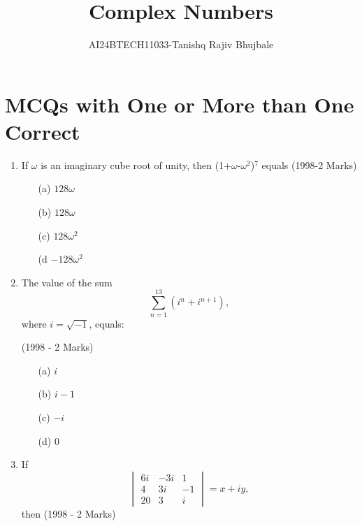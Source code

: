 \documentclass[journal,12pt,twocolumn]{IEEEtran}
\theoremstyle{remark}
\begin{document}

\vspace{3cm}
\title{Complex Numbers}
\author{AI24BTECH11033-Tanishq Rajiv Bhujbale}
\maketitle
\newpage
\bigskip

\renewcommand{\thefigure}{\theenumi}
\renewcommand{\thetable}{\theenumi}

\section{MCQs with One or More than One Correct}

\begin{enumerate}
    \item If $\omega$ is an imaginary cube root of unity, then 
    (1+$\omega$-$\omega^2$)$^7$ equals \hfill (1998-2 Marks)
    
    \begin{itemize}
    \item[(a)] \(128\omega\)    
    \item[(b)]\(128\omega\)
    \item[(c)]\(128\omega^2\)
    \item[(d]\(-128\omega^2\)
    \end{itemize}
    

   \item The value of the sum 
\[
\sum_{n=1}^{13} \left(i^n + i^{n+1}\right),
\]
where \( i = \sqrt{-1} \), equals:

\hfill (1998 - 2 Marks)

\begin{multicols}{4}
    \begin{itemize}
    \item[(a)] \( i \)
    \item[(b)] \( i - 1 \)
    \item[(c)] \( -i \)
    \item[(d)] \( 0 \)
    \end{itemize}
\end{multicols}


    \item If 
\[
\begin{vmatrix}
6i & -3i & 1 \\
4 & 3i & -1 \\
20 & 3 & i
\end{vmatrix}
= x + iy,
\]
then \hfill (1998 - 2 Marks)


\end{enumerate}
\end{document}
